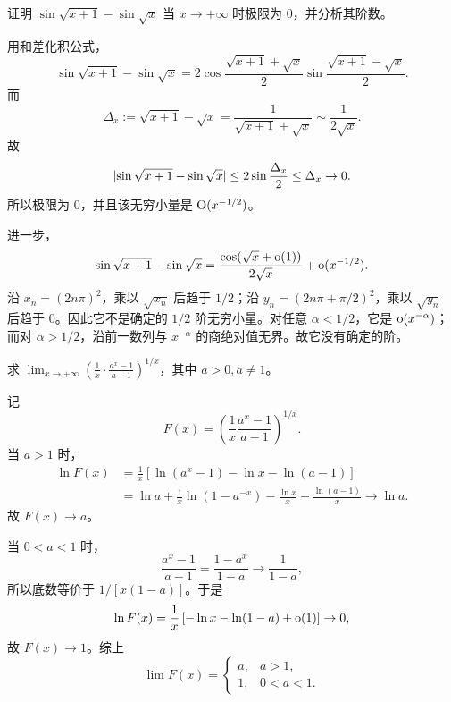 \begin{xreferenceproblem}[4]
证明 $\sin\sqrt{x+1}-\sin\sqrt{x}$ 当 $x\to+\infty$ 时极限为 0，并分析其阶数。
\end{xreferenceproblem}
\begin{xsolution}
用和差化积公式，
\[
  \sin\sqrt{x+1}-\sin\sqrt{x}
  =2\cos\frac{\sqrt{x+1}+\sqrt{x}}2
    \sin\frac{\sqrt{x+1}-\sqrt{x}}2.
\]
而
\[
  \Delta_x:=\sqrt{x+1}-\sqrt{x}
  =\frac1{\sqrt{x+1}+\sqrt{x}}
  \sim\frac1{2\sqrt{x}}.
\]
故
\[
  \lvert\sin\sqrt{x+1}-\sin\sqrt{x}\rvert
  \leq2\sin\frac{\Delta_x}{2}\leq\Delta_x\to0.
\]
所以极限为 0，并且该无穷小量是 $\mathrm{O}(x^{-1/2})$。

进一步，
\[
  \sin\sqrt{x+1}-\sin\sqrt{x}
  =\frac{\cos(\sqrt{x}+\mathrm{o}(1))}{2\sqrt{x}}
   +\mathrm{o}(x^{-1/2}).
\]
沿 $x_n=(2n\pi)^2$，乘以 $\sqrt{x_n}$ 后趋于 $1/2$；沿
$y_n=(2n\pi+\pi/2)^2$，乘以 $\sqrt{y_n}$ 后趋于 0。因此它不是确定的 $1/2$ 阶无穷小量。对任意 $\alpha<1/2$，它是 $\mathrm{o}(x^{-\alpha})$；而对 $\alpha>1/2$，沿前一数列与 $x^{-\alpha}$ 的商绝对值无界。故它没有确定的阶。
\end{xsolution}


\begin{xreferenceproblem}[5]
求 $\displaystyle\lim_{x\to+\infty}\left(\frac1x\cdot\frac{a^x-1}{a-1}\right)^{1/x}$，其中 $a>0,a\ne1$。
\end{xreferenceproblem}
\begin{xsolution}
记
\[
  F(x)=\left(\frac1x\frac{a^x-1}{a-1}\right)^{1/x}.
\]
当 $a>1$ 时，
\begin{align*}
  \ln F(x)
  &=\frac1x\left[\ln(a^x-1)-\ln x-\ln(a-1)\right]\\
  &=\ln a+\frac1x\ln(1-a^{-x})
    -\frac{\ln x}{x}-\frac{\ln(a-1)}x\to\ln a.
\end{align*}
故 $F(x)\to a$。

当 $0<a<1$ 时，
\[
  \frac{a^x-1}{a-1}=\frac{1-a^x}{1-a}\to\frac1{1-a},
\]
所以底数等价于 $1/[x(1-a)]$。于是
\[
  \ln F(x)=\frac1x\left[-\ln x-\ln(1-a)+\mathrm{o}(1)\right]\to0,
\]
故 $F(x)\to1$。综上
\[
  \boxed{\lim F(x)=
  \begin{cases}
    a,&a>1,\\
    1,&0<a<1.
  \end{cases}}
\]
\end{xsolution}


